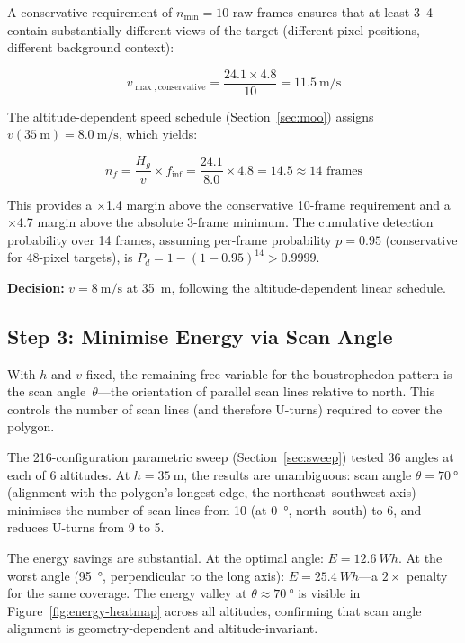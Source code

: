 A conservative requirement of $n_{\min} = 10$ raw frames ensures that at least 3--4 contain substantially different views of the target (different pixel positions, different background context):

\begin{equation}
  v_{\max,\mathrm{conservative}} = \frac{24.1 \times 4.8}{10} = \SI{11.5}{\metre\per\second}
\end{equation}

The altitude-dependent speed schedule (Section~\ref{sec:moo}) assigns $v(\SI{35}{\metre}) = \SI{8.0}{\metre\per\second}$, which yields:

\begin{equation}
  n_f = \frac{H_g}{v} \times f_{\mathrm{inf}} = \frac{24.1}{8.0} \times 4.8 = 14.5 \approx 14 \text{ frames}
\end{equation}

\noindent This provides a $\times$1.4 margin above the conservative 10-frame requirement and a $\times$4.7 margin above the absolute 3-frame minimum.
The cumulative detection probability over 14 frames, assuming per-frame probability $p = 0.95$ (conservative for 48-pixel targets), is $P_d = 1 - (1-0.95)^{14} > 0.9999$.

\textbf{Decision:} $v = \SI{8}{\metre\per\second}$ at \SI{35}{\metre}, following the altitude-dependent linear schedule.

\subsection{Step 3: Minimise Energy via Scan Angle}\label{sec:step-scan-angle}

With $h$ and $v$ fixed, the remaining free variable for the boustrophedon pattern is the scan angle~$\theta$---the orientation of parallel scan lines relative to north.
This controls the number of scan lines (and therefore U-turns) required to cover the polygon.

The 216-configuration parametric sweep (Section~\ref{sec:sweep}) tested 36 angles at each of 6 altitudes.
At $h = \SI{35}{\metre}$, the results are unambiguous: scan angle $\theta = \SI{70}{\degree}$ (alignment with the polygon's longest edge, the northeast--southwest axis) minimises the number of scan lines from 10 (at \SI{0}{\degree}, north--south) to 6, and reduces U-turns from 9 to 5.

The energy savings are substantial.
At the optimal angle: $E = \SI{12.6}{Wh}$.
At the worst angle (\SI{95}{\degree}, perpendicular to the long axis): $E = \SI{25.4}{Wh}$---a $2\times$ penalty for the same coverage.
The energy valley at $\theta \approx \SI{70}{\degree}$ is visible in Figure~\ref{fig:energy-heatmap} across all altitudes, confirming that scan angle alignment is geometry-dependent and altitude-invariant.

